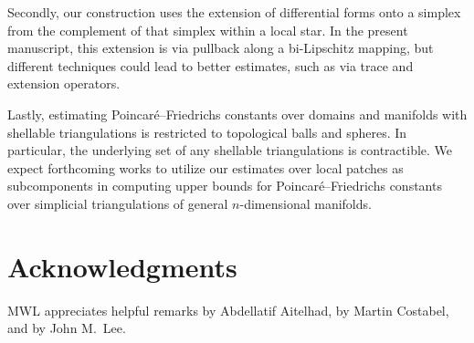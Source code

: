 \documentclass[10pt,a4paper]{article}
\begin{document}
Secondly, our construction uses the extension of differential forms onto a simplex from the complement of that simplex within a local star. 
In the present manuscript, this extension is via pullback along a bi-Lipschitz mapping, but different techniques could lead to better estimates,
such as via trace and extension operators.

Lastly, estimating Poincar\'e--Friedrichs constants over domains and manifolds with shellable triangulations is restricted to topological balls and spheres. 
In particular, the underlying set of any shellable triangulations is contractible. 
We expect forthcoming works to utilize our estimates over local patches as subcomponents in computing upper bounds for Poincar\'e--Friedrichs constants over simplicial triangulations of general $n$-dimensional manifolds. 




\section*{Acknowledgments}

MWL appreciates helpful remarks by Abdellatif Aitelhad, by Martin Costabel, and by John M.\ Lee.



\end{document}
